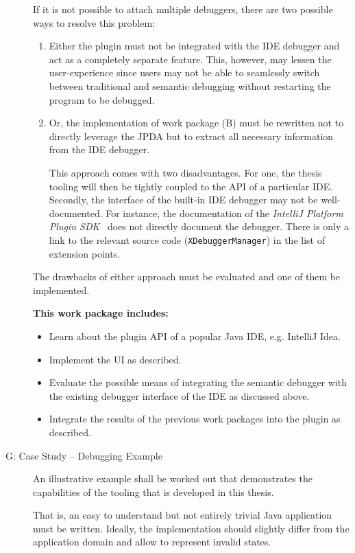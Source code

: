 \documentclass[
	english,
	accentcolor=9c,%
  marginpar=0cm %
	]{tudapub}
\begin{document}
\begin{description}
    If it is not possible to attach multiple debuggers, there are two possible
    ways to resolve this problem:
    \begin{enumerate}
      \item Either the plugin must not be integrated with the IDE debugger and
        act as a completely separate feature.
        This, however, may lessen the user-experience since users may not be
        able to seamlessly switch between traditional and semantic debugging
        without restarting the program to be debugged.
      \item Or, the implementation of work package (B) must be rewritten not
        to directly leverage the JPDA but to extract all necessary information
        from the IDE debugger.

        This approach comes with two disadvantages. For one, the thesis tooling
        will then be tightly coupled to the API of a particular IDE.
        Secondly, the interface of the built-in IDE debugger may not be
        well-documented.
        For instance, the documentation of the
        \emph{IntelliJ Platform Plugin SDK}~\cite{pluginsdk} does not directly
        document the debugger. There is only a link to the relevant source code
        (\lstinline|XDebuggerManager|) in the list of extension points.
    \end{enumerate}
    The drawbacks of either approach must be evaluated and one of them be
    implemented.

    \textbf{This work package includes:}
    \begin{itemize}
      \item Learn about the plugin API of a popular Java IDE, e.g.
        IntelliJ Idea.
      \item Implement the UI as described.
      \item Evaluate the possible means of integrating the semantic debugger
        with the existing debugger interface of the IDE as discussed above.
      \item Integrate the results of the previous work packages into the
        plugin as described.
    \end{itemize}
  \item[G: Case Study -- Debugging Example]
    An illustrative example shall be worked out that demonstrates the
    capabilities of the tooling that is developed in this thesis.

    That is, an easy to understand but not entirely trivial Java application
    must be written. Ideally, the implementation should slightly differ from the
    application domain and allow to represent invalid states.


\end{description}
\end{document}
